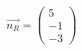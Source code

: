 \documentclass[preview]{standalone}
\begin{document}
\begin{center}
$\vec{n_R} = \begin{pmatrix} 5 \\ -1 \\ -3 \end{pmatrix}$
\end{center}
\end{document}
